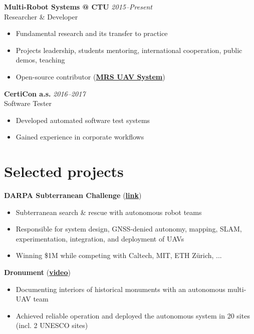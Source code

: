 \documentclass[12pt,a4paper]{article}
\newcommand\Colorhreff[3][reff]{\href{#2}{\color{#1}#3}}
\begin{document}
\begin{paracol}{2}
\vspace{0.5cm}
\noindent
\textbf{Multi-Robot Systems @ CTU} \hfill \textit{2015–Present} \\
Researcher \& Developer
\begin{itemize}
  \item Fundamental research and its transfer to practice
  \item Projects leadership, students mentoring, international cooperation, public demos, teaching
  \item Open-source contributor (\Colorhreff{https://github.com/ctu-mrs/mrs_uav_system}{\textbf{MRS UAV System}})
\end{itemize}

\vspace{0.5cm}
\noindent
\textbf{CertiCon a.s.} \hfill \textit{2016–2017} \\
Software Tester
\begin{itemize}
  \item Developed automated software test systems
  \item Gained experience in corporate workflows
\end{itemize}

\section*{Selected projects}

\noindent
\textbf{DARPA Subterranean Challenge} (\Colorhreff{http://mrs.fel.cvut.cz/projects/darpa}{\textbf{link}})
\begin{itemize}
  \item Subterranean search \& rescue with autonomous robot teams
  \item Responsible for system design, GNSS-denied autonomy, mapping, SLAM, experimentation, integration, and deployment of UAVs
  \item Winning \$1M while competing with Caltech, MIT, ETH Zürich, ... 
\end{itemize}

\vspace{0.2cm}
\noindent
\textbf{Dronument} (\Colorhreff{https://www.youtube.com/watch?v=Gx-mBklSbYc}{\textbf{video}})
\begin{itemize}
    \item Documenting interiors of historical monuments with an autonomous multi-UAV team
    \item Achieved reliable operation and deployed the autonomous system in 20 sites (incl. 2 UNESCO sites)
\end{itemize}


\end{paracol}
\end{document}
